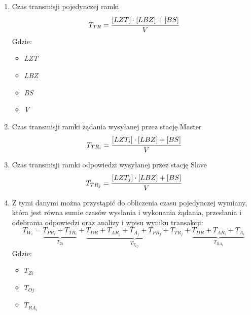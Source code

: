 \documentclass[a4paper,twoside]{article}
\begin{document}
	\begin{enumerate}
		\item Czas transmisji pojedynczej ramki
		\begin{equation}
			T_{TR}=\cfrac{[LZT] \cdot [LBZ]+[BS]}{V}
		\end{equation}
		Gdzie:
		\begin{itemize}
			\item \emph{LZT} 
			\item \emph{LBZ} 
			\item \emph{BS} 
			\item \emph{V} 
		\end{itemize}
		\item Czas transmisji ramki żądania wysyłanej przez stację Master
		\begin{equation}
			T_{TR_i}=\cfrac{[LZT_i] \cdot [LBZ]+[BS]}{V}
		\end{equation}
		\item Czas transmisji ramki odpowiedzi wysyłanej przez stację Slave
		\begin{equation}
			T_{TR_j}=\cfrac{[LZT_j] \cdot [LBZ]+[BS]}{V}
		\end{equation}
		\item Z tymi danymi można przystąpić do obliczenia czasu pojedynczej wymiany, która jest równa sumie czasów wysłania i wykonania żądania, przesłania i odebrania odpowiedzi oraz analizy i wpisu wyniku transakcji:
		\begin{equation}
			T_{W_{i}} = \underbrace{T_{PR_i} + T_{TR_i}}_{T_{Zi}} +
			\underbrace{T_{DR}+T_{AR_j}+T_{A_j}+T_{PR_j}+T_{TR_j}}_{T_{T_{Oj}}} + 
			\underbrace{T_{DR}+T_{AR_i}+T_{A_i}}_{T_{RA_i}}
		\end{equation}
		Gdzie:
		\begin{itemize}
			\item $ T_{Zi} $ 
			\item $ T_{Oj} $ 
			\item $ T_{RA_i} $ 
		\end{itemize}

\end{enumerate}
\end{document}
